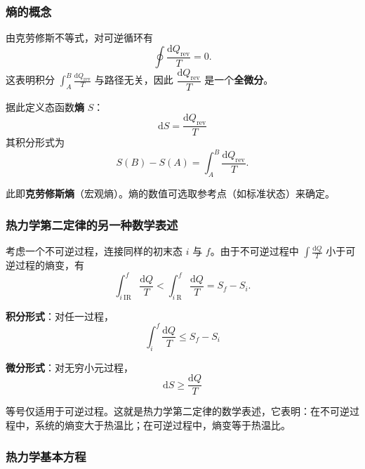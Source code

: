 \documentclass[UTF8]{ctexart}
\theoremstyle{definition}
\begin{document}
\subsubsection*{熵的概念}

由克劳修斯不等式，对可逆循环有
\begin{equation}
\oint\frac{\mathrm{d}Q_{\mathrm{rev}}}{T}=0.
\end{equation}
这表明积分 $\displaystyle\int_A^B\frac{\mathrm{d}Q_{\mathrm{rev}}}{T}$ 与路径无关，因此 $\dfrac{\mathrm{d}Q_{\mathrm{rev}}}{T}$ 是一个\textbf{全微分}。

据此定义态函数\textbf{熵} $S$：
\begin{equation}
\boxed{\mathrm{d}S=\frac{\mathrm{d}Q_{\mathrm{rev}}}{T}}
\end{equation}
其积分形式为
\begin{equation}
S(B)-S(A)=\int_A^B\frac{\mathrm{d}Q_{\mathrm{rev}}}{T}.
\end{equation}

此即\textbf{克劳修斯熵}（宏观熵）。熵的数值可选取参考点（如标准状态）来确定。

\subsubsection*{热力学第二定律的另一种数学表述}

考虑一个不可逆过程，连接同样的初末态 $i$ 与 $f$。由于不可逆过程中 $\displaystyle\int\frac{\mathrm{d}Q}{T}$ 小于可逆过程的熵变，有
\begin{equation}
\int_{i\ \mathrm{IR}}^{f}\frac{\mathrm{d}Q}{T}<\int_{i\ \mathrm{R}}^{f}\frac{\mathrm{d}Q}{T}=S_f-S_i.
\end{equation}

\textbf{积分形式}：对任一过程，
\begin{equation}
\boxed{\int_i^f\frac{\mathrm{d}Q}{T}\le S_f-S_i}
\end{equation}

\textbf{微分形式}：对无穷小元过程，
\begin{equation}
\boxed{\mathrm{d}S\ge\frac{\mathrm{d}Q}{T}}
\end{equation}

等号仅适用于可逆过程。这就是热力学第二定律的数学表述，它表明：在不可逆过程中，系统的熵变大于热温比；在可逆过程中，熵变等于热温比。

\subsubsection*{热力学基本方程}
\end{document}
